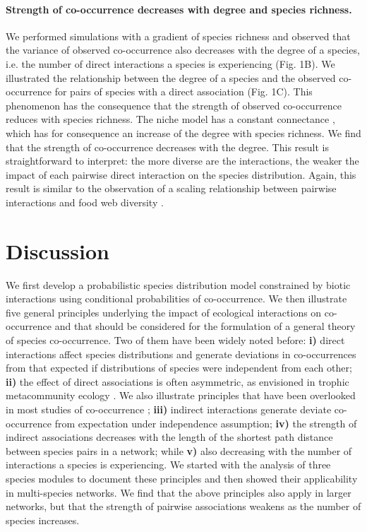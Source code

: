 \paragraph*{Strength of co-occurrence decreases with degree and species
richness.} We performed simulations with a gradient of species richness and
observed that the variance of observed co-occurrence also decreases with the
degree of a species, i.e. the number of direct interactions a species is experiencing (Fig. 1B). We illustrated the relationship between the
degree of a species and the observed co-occurrence for pairs of species with a
direct association (Fig. 1C). This phenomenon has the consequence that the
strength of observed co-occurrence reduces with species richness. The niche
model has a constant connectance \citep{Williams2000}, which has for consequence an increase of the degree with species richness. We find that the strength of co-occurrence
decreases with the degree. This result is straightforward to interpret: the
more diverse are the interactions, the weaker the impact of each
pairwise direct interaction on the species distribution. Again, this result is
similar to the observation of a scaling relationship between pairwise
interactions and food web diversity \citep{Berlow2009}.

\section*{Discussion}
\label{discussion}

%
We first develop a probabilistic species distribution model constrained by
biotic interactions using conditional probabilities of co-occurrence. We then illustrate five general principles underlying the impact of ecological interactions on co-occurrence and that should be considered for the formulation of a general theory of species co-occurrence. Two of them have been widely noted before: \textbf{i)} direct interactions affect species distributions and generate deviations in co-occurrences from that expected if distributions of species were independent from each other; \textbf{ii)} the effect of direct associations is often asymmetric, as envisioned in trophic metacommunity ecology \citep{Holt2009}. We also illustrate principles that have been overlooked in most studies of co-occurrence \citep{Araujo2011}; \textbf{iii)} indirect interactions generate deviate co-occurrence from expectation under independence assumption; \textbf{iv)} the strength of indirect associations decreases with the length of the shortest path distance between species pairs in a network; while \textbf{v)} also decreasing with the number of interactions a species is experiencing. We started with the analysis of three species modules to document these principles and then showed their applicability in multi-species networks. We find that the above principles also apply in larger networks, but that the strength of pairwise associations weakens as the number of species increases.

